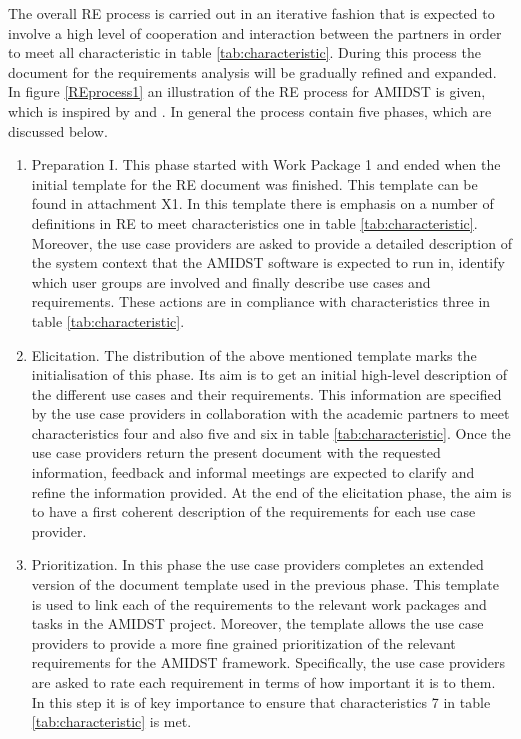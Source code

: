 \documentclass[11pt, oneside]{article}   	%
\begin{document}
The overall RE process is carried out in an iterative fashion that is expected to involve a high level of cooperation and interaction between the partners in order to meet all characteristic in table \ref{tab:characteristic}. During this process the document for the requirements analysis will be gradually refined and expanded. In figure \ref{REprocess1}  an illustration of the RE process for AMIDST is given, which is inspired by and \cite{Ebe10}.  In general the process contain five phases, which are discussed below.
\begin{enumerate}
 \item Preparation I.  This phase started with Work Package 1 and ended when the initial template for the RE document was finished.  This template can be found in attachment X1. In this template there is emphasis on a number of definitions in RE to meet characteristics one in table \ref{tab:characteristic}.  Moreover, the use case providers are asked to provide a detailed description of the system context that the AMIDST software is expected to run in, identify which user groups are involved and finally describe use cases and requirements.  These actions are in compliance with characteristics three in table \ref{tab:characteristic}.  
\item Elicitation. The distribution of the above mentioned template marks the initialisation of this phase.  Its aim is to get an initial high-level description of the different use cases and their requirements. This information are specified by the use case providers in collaboration with the academic partners to meet characteristics four and also five and six in table \ref{tab:characteristic}.  Once the use case providers return the present document with the requested information, feedback and informal meetings are expected to clarify and refine the information provided.  At the end of the elicitation phase, the aim is to have a first coherent description of the requirements for each use case provider.
 \item Prioritization. In this phase the use case providers completes an extended version of the document template used in the previous phase. This template is used to link each of the requirements to the relevant work packages and tasks in the AMIDST project. Moreover, the template allows the use case providers to provide a more fine grained prioritization of the relevant requirements for the AMIDST framework.  Specifically, the use case providers are asked to rate each requirement in terms of how important it is to them.  In this step it is of key importance to ensure that characteristics 7 in table  \ref{tab:characteristic} is met.

\end{enumerate}
\end{document}
